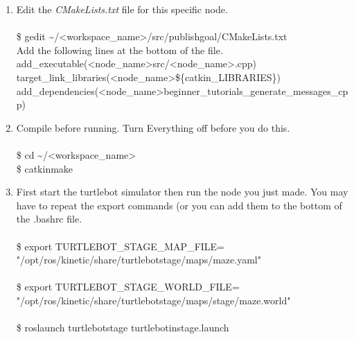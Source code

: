 \documentclass[12pt]{article}
\newcommand{\R}{\color{red}}
\newcommand{\K}{\color{black}}
\newcommand{\PR}{\color{mypurple}}
\newcommand{\wspname}{\R<workspace\_name>\K}
\newcommand{\nodname}{\PR<node\_name>\K}
\newcommand{\home}{\textasciitilde/}
\newcommand{\pthname}{/opt/ros/kinetic/share/turtlebot\textunderscore stage/maps/}
\begin{document}
\begin{enumerate}
    \newpage
    
    \item Edit the {\it CMakeLists.txt} file for this specific node. \\\\
    {\selectfont  \hspace{5mm} \$ gedit \home\wspname/src/publish\textunderscore goal/CMakeLists.txt }\\
    
    Add the following lines at the bottom of the file. \\
    
   {\selectfont add\_executable(\nodname\hspace{3mm}src/\nodname.cpp) } \\
{\selectfont target\_link\_libraries(\nodname \hspace{3mm}\$\{catkin\_LIBRARIES\}) } \\
{\selectfont add\_dependencies(\nodname \hspace{3mm}beginner\_tutorials\_generate\_messages\_cpp) }\\

     \item Compile before running. Turn Everything off before you do this.\\\\
    {\selectfont  \hspace{5mm} \$ cd \home\wspname }\\
    {\selectfont  \hspace{5mm} \$ catkin\textunderscore make }

    \item First start the turtlebot simulator then run the node you just made. You may have to repeat the export commands (or you can add them to the bottom of the .bashrc file. \\\\
{\selectfont  \hspace{5mm} \$ export TURTLEBOT\_STAGE\_MAP\_FILE=\\"\pthname maze.yaml"}\\\\
{\selectfont  \hspace{5mm} \$ export TURTLEBOT\_STAGE\_WORLD\_FILE=\\"\pthname stage/maze.world"}\\\\ 
{\selectfont  \hspace{5mm} \$ roslaunch turtlebot\textunderscore stage turtlebot\textunderscore in\textunderscore stage.launch}\\


\end{enumerate}
\end{document}
